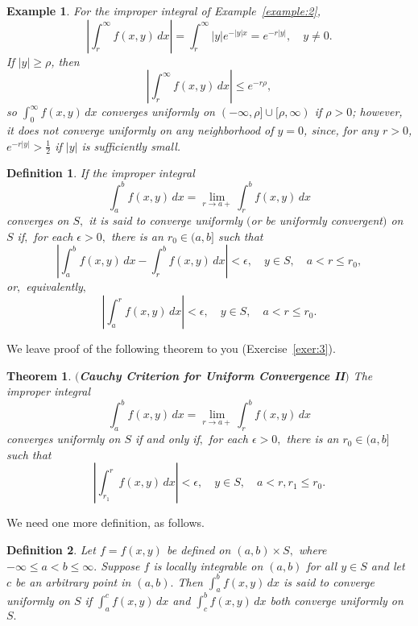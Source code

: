 \documentclass{article}
\newtheorem{definition}{Definition}
\newtheorem{theorem}{Theorem}
\newtheorem{example}{Example}
\begin{document}
\begin{example}  \label{example:4}  \rm
For the improper integral of Example~\ref{example:2},
$$
\left|\int_{r}^{\infty}f(x,y)\,dx\right|=
\int_{r}^{\infty} |y|e^{-|y|x}=e^{-r|y|}, \quad y\ne0.
$$
If $|y| \ge \rho$, then
$$
\left|\int_{r}^{\infty}f(x,y)\,dx\right| \le e^{-r\rho},
$$
so $\int_{0}^{\infty}f(x,y)\,dx$  converges uniformly on
$(-\infty,\rho]\cup[\rho,\infty)$ if $\rho>0$; however, it does not
converge uniformly  on any neighborhood of $y=0$, since, for any
$r>0$,
$e^{-r|y|}>\frac{1}{2}$ if $|y|$ is sufficiently small.
\end{example}



\begin{definition}  \label{definition:2}
If the  improper integral
$$
\int_{a}^{b}f(x,y)\,dx=\lim_{r\to a+}\int_{r}^{b}f(x,y)\,dx
$$
converges on $S,$ it
 is said to converge
uniformly $($or be uniformly convergent$)$  on $S$ if$,$  for each
$\epsilon>0,$ there is an
$r_{0} \in (a,b]$
  such that
$$
\left|\int_{a}^{b}f(x,y)\,dx-\int_{r}^{b}f(x,y)\,dx\right|
<\epsilon, \quad  y\in S,\quad
a<r\le  r_{0},
$$
or$,$ equivalently$,$
$$
\left|\int_{a}^{r} f(x,y)\,dx\right|< \epsilon, \quad  y\in S,\quad
  a<r\le  r_{0}.
$$
\end{definition}

We leave proof of the following theorem to you (Exercise~\ref{exer:3}).


\begin{theorem}{\bf $($Cauchy Criterion for Uniform Convergence II$)$}
\label{theorem:5}
The improper integral
$$
\int_{a}^{b}f(x,y)\,dx =\lim_{r\to a+}\int_{r}^{b}f(x,y)\,dx
$$
converges uniformly on $S$ if and only if$,$
 for each $\epsilon>0,$ there is
an  $r_{0}\in (a,b]$ such that
$$
\left|\int_{r_{1}}^{r}f(x,y)\,dx\right|< \epsilon,\quad
y\in S,\quad  a <r,r_{1}\le r_{0}.
$$
\end{theorem}

We need one more definition, as follows.

\begin{definition}  \label{definition:3}
Let $f=f(x,y)$ be defined on $(a,b) \times S,$ where $-\infty\le a<b\le
\infty.$ Suppose  $f$ is locally  integrable on
$(a,b)$ for all $y\in S$ and let
 $c$ be an arbitrary point in $(a,b).$
Then
$\int_{a}^{b}f(x,y)\,dx$ is said to converge
uniformly on  $S$ if  $\int_{a}^{c}f(x,y)\,dx$  and
$\int_{c}^{b}f(x,y)\,dx$ both converge uniformly on $S.$
\end{definition}
\end{document}
